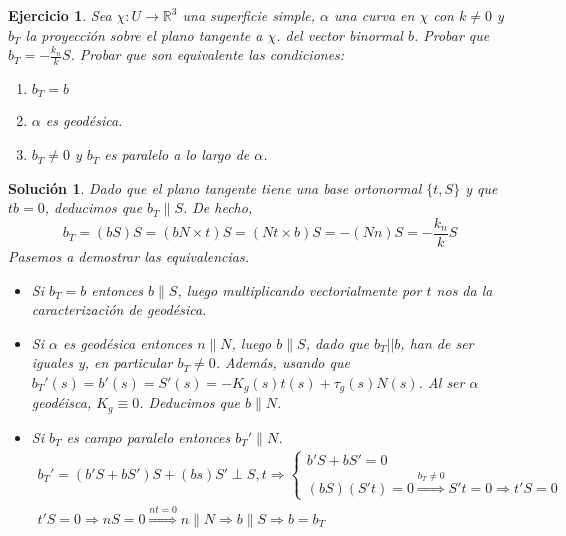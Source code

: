 \documentclass{article}
\theoremstyle{plain}
\newtheorem{exercise}{Ejercicio}
\newtheorem*{sol*}{Solución}
\newcommand{\R}{\mathbb{R}}
\newcommand{\X}{\chi}
\begin{document}
\newpage
\begin{exercise}
Sea $\X:U\rightarrow \R^3$ una superficie simple, $\alpha$ una curva en $\X$ con $k\neq 0$ y $b_T$ la proyección sobre el plano tangente a $\X$. del vector binormal $b$. Probar que $b_T = -\frac{k_n}{k}S$. Probar que son equivalente las condiciones:
\begin{enumerate}
\item $b_T = b$
\item $\alpha$ es geodésica.
\item $b_T \neq 0$ y $b_T$ es paralelo a lo largo de $\alpha$.
\end{enumerate}
\end{exercise}
\begin{sol*}
Dado que el plano tangente tiene una base ortonormal $\{t,S\}$ y que $tb=0$, deducimos que $b_T \parallel S$. De hecho,
\[
b_T = (bS)S = (b N\times t)S = (N t \times b)S = -(N n)S = -\frac{k_n}{k}S
\]
Pasemos a demostrar las equivalencias.
\begin{itemize}
\item Si $b_T = b$ entonces $b\parallel S$, luego multiplicando vectorialmente por $t$ nos da la caracterización de geodésica.
\item Si $\alpha$ es geodésica entonces $n\parallel N$, luego $b\parallel S$, dado que $b_T || b$, han de ser iguales y, en particular $b_T\neq 0$. Además, usando que $b_T'(s) = b'(s)=S'(s)=-K_g(s)t(s)+ \tau_g(s)N(s)$. Al ser $\alpha$ geodéisca, $K_g\equiv 0$. Deducimos que $b\parallel N$.
\item Si $b_T$ es campo paralelo entonces $b_T'\parallel N$.
\begin{gather*}
b_T' = (b'S+bS')S+(bs)S' \perp S,t \Rightarrow 
\begin{cases}
b'S+bS' = 0\\
(bS)(S't) = 0 \overset{b_T\neq 0}{\Rightarrow} S't = 0 \Rightarrow t'S = 0
\end{cases}\\
t'S = 0 \Rightarrow nS=0 \overset{nt=0}{\Rightarrow} n\parallel N \Rightarrow b\parallel S \Rightarrow b=b_T
\end{gather*}
\end{itemize} 
\end{sol*}
\end{document}
